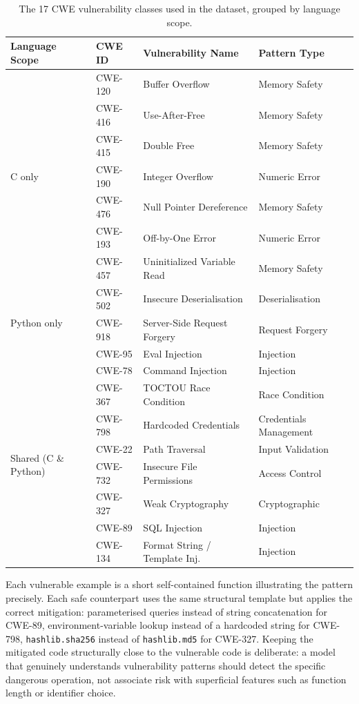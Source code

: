 \begin{table}[H]
  \centering
  \small
  \caption{The 17 CWE vulnerability classes used in the dataset, grouped by language scope.}
  \label{tab:cwe_dataset}
  \begin{tabular}{llll}
    \toprule
    Language Scope & CWE ID & Vulnerability Name & Pattern Type \\
    \midrule
    \multirow{7}{*}{C only}
      & CWE-120 & Buffer Overflow              & Memory Safety \\
      & CWE-416 & Use-After-Free               & Memory Safety \\
      & CWE-415 & Double Free                  & Memory Safety \\
      & CWE-190 & Integer Overflow             & Numeric Error \\
      & CWE-476 & Null Pointer Dereference     & Memory Safety \\
      & CWE-193 & Off-by-One Error             & Numeric Error \\
      & CWE-457 & Uninitialized Variable Read  & Memory Safety \\
    \midrule
    \multirow{3}{*}{Python only}
      & CWE-502 & Insecure Deserialisation     & Deserialisation \\
      & CWE-918 & Server-Side Request Forgery  & Request Forgery \\
      & CWE-95  & Eval Injection               & Injection \\
    \midrule
    \multirow{8}{*}{Shared (C \& Python)}
      & CWE-78  & Command Injection            & Injection \\
      & CWE-367 & TOCTOU Race Condition        & Race Condition \\
      & CWE-798 & Hardcoded Credentials        & Credentials Management \\
      & CWE-22  & Path Traversal               & Input Validation \\
      & CWE-732 & Insecure File Permissions    & Access Control \\
      & CWE-327 & Weak Cryptography            & Cryptographic \\
      & CWE-89  & SQL Injection                & Injection \\
      & CWE-134 & Format String / Template Inj.& Injection \\
    \bottomrule
  \end{tabular}
\end{table}

Each vulnerable example is a short self-contained function illustrating the pattern precisely.
Each safe counterpart uses the same structural template but applies the correct mitigation:
parameterised queries instead of string concatenation for CWE-89, environment-variable lookup
instead of a hardcoded string for CWE-798, \texttt{hashlib.sha256} instead of
\texttt{hashlib.md5} for CWE-327.
Keeping the mitigated code structurally close to the vulnerable code is deliberate:
a model that genuinely understands vulnerability patterns should detect the specific dangerous
operation, not associate risk with superficial features such as function length or identifier choice.

